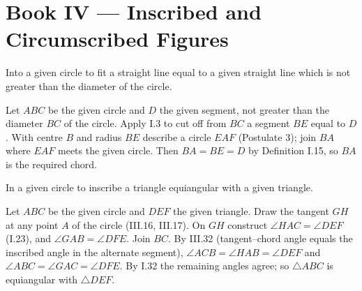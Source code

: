 %
%

\section{Book IV --- Inscribed and Circumscribed Figures}
\label{sec:book-IV}

\begin{claim}
\label{prop:IV.1}
Into a given circle to fit a straight line equal to a given straight
line which is not greater than the diameter of the circle.
\end{claim}
\begin{evidence}[Proof of IV.1]
\label{ev:IV.1}
Let $ABC$ be the given circle and $D$ the given segment, not greater
than the diameter $BC$ of the circle.  Apply I.3 to cut off from $BC$
a segment $BE$ equal to $D$.  With centre $B$ and radius $BE$ describe
a circle $EAF$ (Postulate 3); join $BA$ where $EAF$ meets the given
circle.  Then $BA = BE = D$ by Definition I.15, so $BA$ is the required
chord.
\end{evidence}

\begin{claim}
\label{prop:IV.2}
In a given circle to inscribe a triangle equiangular with a given
triangle.
\end{claim}
\begin{evidence}[Proof of IV.2]
\label{ev:IV.2}
Let $ABC$ be the given circle and $DEF$ the given triangle.  Draw the
tangent $GH$ at any point $A$ of the circle (III.16, III.17).  On $GH$
construct $\angle HAC = \angle DEF$ (I.23), and $\angle GAB = \angle
DFE$.  Join $BC$.  By III.32 (tangent--chord angle equals the
inscribed angle in the alternate segment), $\angle ACB = \angle HAB
= \angle DEF$ and $\angle ABC = \angle GAC = \angle DFE$.  By I.32 the
remaining angles agree; so $\triangle ABC$ is equiangular with
$\triangle DEF$.
\end{evidence}

